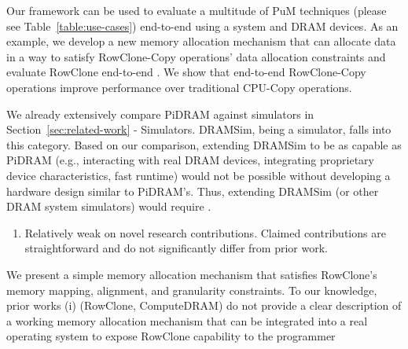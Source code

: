 Our framework can be used to evaluate a multitude of PuM techniques (please see Table~\ref{table:use-cases}) end-to-end using a  system and  DRAM devices. As an example, we develop a new memory allocation mechanism that can allocate data in a way to satisfy RowClone-Copy operations’ data allocation constraints and evaluate RowClone end-to-end . We show that end-to-end RowClone-Copy operations improve performance over traditional CPU-Copy operations.

We already extensively compare PiDRAM against simulators in Section~\ref{sec:related-work} - Simulators. DRAMSim, being a simulator, falls into this category. Based on our comparison, extending DRAMSim to be as capable as PiDRAM (e.g., interacting with real DRAM devices, integrating proprietary device characteristics, fast runtime) would not be possible without developing a hardware design similar to PiDRAM’s. Thus, extending DRAMSim (or other DRAM system simulators) would require .

\newpage 
\begin{center}
    {\Large {}}
\end{center}


\begin{tcolorbox}
    \begin{enumerate}[label=R3/\arabic*]
        \item \label{q:r3q1} Relatively weak on novel research contributions. Claimed contributions are straightforward and do not significantly differ from prior work.
    \end{enumerate}
\end{tcolorbox} 

We present a simple memory allocation mechanism that satisfies RowClone’s memory mapping, alignment, and granularity constraints.  To our knowledge, prior works (i)  (RowClone, ComputeDRAM) do not provide a clear description of a working memory allocation mechanism that can be integrated into a real operating system to expose RowClone capability to the programmer

